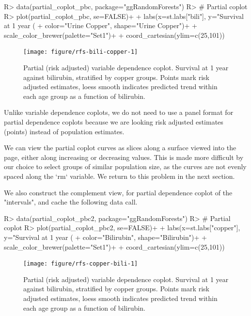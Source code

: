 \documentclass[nojss]{jss}\usepackage[]{graphicx}\usepackage[]{color}
\begin{document}
\begin{Schunk}
\begin{Sinput}
R> data(partial_coplot_pbc, package="ggRandomForests")
R> # Partial coplot
R> plot(partial_coplot_pbc, se=FALSE)+
+   labs(x=st.labs["bili"], y="Survival at 1 year (%
+        color="Urine Copper", shape="Urine Copper")+
+   scale_color_brewer(palette="Set1")+
+   coord_cartesian(ylim=c(25,101))
\end{Sinput}
\begin{figure}[!htpb]

{\centering \texttt{[image: figure/rfs-bili-copper-1]} 

}

\caption[Partial (risk adjusted) variable dependence coplot]{Partial (risk adjusted) variable dependence coplot. Survival at 1 year against bilirubin, stratified by copper groups. Points mark risk adjusted estimates, loess smooth indicates predicted trend within each age group as a function of bilirubin.\label{fig:bili-copper}}
\end{figure}
\end{Schunk}

Unlike variable dependence coplots, we do not need to use a panel format for partial dependence coplots because we are looking risk adjusted estimates (points) instead of population estimates. 


We can view the partial coplot curves as slices along a surface viewed into the page, either along increasing or decreasing values. This is made more difficult by our choice to select groups of similar population size, as the curves are not evenly spaced along the `rm` variable. We return to this problem in the next section. 

We also construct the complement view, for partial dependence coplot of the  "intervals", and cache the following  data call.



\begin{Schunk}
\begin{Sinput}
R> data(partial_coplot_pbc2, package="ggRandomForests")
R> # Partial coplot
R> plot(partial_coplot_pbc2, se=FALSE)+
+   labs(x=st.labs["copper"], y="Survival at 1 year (%
+        color="Bilirubin", shape="Bilirubin")+
+   scale_color_brewer(palette="Set1")+
+   coord_cartesian(ylim=c(25,101))
\end{Sinput}
\begin{figure}[!htpb]

{\centering \texttt{[image: figure/rfs-copper-bili-1]} 

}

\caption[Partial (risk adjusted) variable dependence coplot]{Partial (risk adjusted) variable dependence coplot. Survival at 1 year against bilirubin, stratified by copper groups. Points mark risk adjusted estimates, loess smooth indicates predicted trend within each age group as a function of bilirubin.\label{fig:copper-bili}}
\end{figure}
\end{Schunk}
\end{document}
